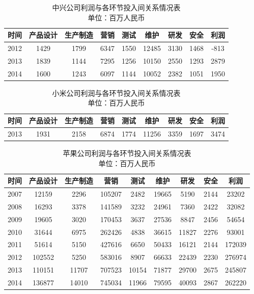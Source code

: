 \documentclass[12pt]{article}%
\begin{document}
\begin{table}[htbp]
  \centering
  \caption{中兴公司利润与各环节投入间关系情况表\\单位：百万人民币}
    \begin{tabular}{ccccccccc}
      \hline
    时间 & 产品设计 & 生产制造 & 营销 & 测试 & 维护 & 研发 & 安全 & 利润 \\
      \hline
    2012 & 1429 & 1799 & 6347 & 1550 & 12485 & 3130 & 1468 & -813 \\
    2013 & 1839 & 1144 & 7295 & 1256 & 10150 & 2550 & 1293 & 2879 \\
    2014 & 1600 & 1243 & 6097 & 1144 & 10052 & 2382 & 1051 & 1950 \\
      \hline
    \end{tabular}%
  \label{tab:addlabel21}%
\end{table}%
\begin{table}[htbp]
  \centering
  \caption{小米公司利润与各环节投入间关系情况表\\单位：百万人民币}
    \begin{tabular}{ccccccccc}
        \hline
    时间 & 产品设计 & 生产制造 & 营销 & 测试 & 维护 & 研发 & 安全 & 利润 \\
        \hline
    2013 & 1931 & 2158 & 6874 & 1774 & 11256 & 3359 & 1697 & 3474 \\
        \hline
    \end{tabular}%
  \label{tab:addlabel31}%
\end{table}%
\begin{table}[htbp]
  \centering
  \caption{苹果公司利润与各环节投入间关系情况表\\单位：百万人民币}
    \begin{tabular}{ccccccccc}
     \hline
    时间 & 产品设计 & 生产制造 & 营销 & 测试 & 维护 & 研发 & 安全 & 利润 \\
     \hline
    2007  & 12159  & 2296  & 105207  & 2482  & 19665  & 5190  & 2144  & 23202  \\
    2008  & 16293  & 3378  & 141589  & 3232  & 24961  & 7360  & 2422  & 32082  \\
    2009  & 19605  & 3020  & 170453  & 3637  & 27536  & 8847  & 2456  & 54654  \\
    2010  & 31644  & 6975  & 262426  & 4838  & 36615  & 11827  & 2276  & 93001  \\
    2011  & 51614  & 5150  & 427616  & 6650  & 50433  & 16121  & 2144  & 172039  \\
    2012  & 102552  & 5250  & 583016  & 8907  & 66633  & 22439  & 2230  & 276974  \\
    2013  & 110151  & 11707  & 707523  & 10154  & 71877  & 29700  & 2675  & 245807  \\
    2014  & 136877  & 14010  & 745034  & 11966  & 79595  & 40093  & 2867  & 262220  \\
     \hline
    \end{tabular}%
  \label{tab:addlabel41}%
\end{table}%
\end{document}
